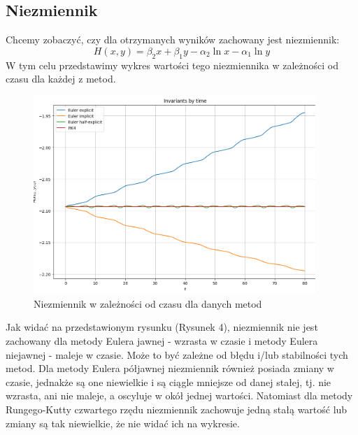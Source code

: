 \documentclass{article}
\begin{document}
\subsection{Niezmiennik}
Chcemy zobaczyć, czy dla otrzymanych wyników zachowany jest niezmiennik:
$$H(x,y) = \beta_2x + \beta_1y - \alpha_2\ln x - \alpha_1\ln y$$
W tym celu przedstawimy wykres wartości tego niezmiennika w zależności od czasu dla każdej z metod.
\begin{figure}[H]
    \centering
    \includegraphics[width=0.95\textwidth]{4}
    \caption{Niezmiennik w zależności od czasu dla danych metod}
    \label{fig:mesh}
\end{figure}
Jak widać na przedstawionym rysunku (Rysunek 4), niezmiennik nie jest zachowany dla metody Eulera jawnej - wzrasta w czasie i metody Eulera niejawnej - maleje w czasie. Może to być zależne od błędu i/lub stabilności tych metod. Dla metody Eulera półjawnej niezmiennik również posiada zmiany w czasie, jednakże są one niewielkie i są ciągle mniejsze od danej stałej, tj. nie wzrasta, ani nie maleje, a oscyluje w okół jednej wartości. Natomiast dla metody Rungego-Kutty czwartego rzędu niezmiennik zachowuje jedną stałą wartość lub zmiany są tak niewielkie, że nie widać ich na wykresie.
\end{document}
